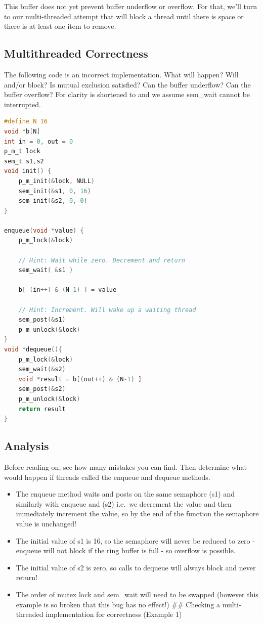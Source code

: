 This buffer does not yet prevent buffer underflow or overflow. For that, we'll turn to our multi-threaded attempt that will block a thread until there is space or there is at least one item to remove.


\subsection{Multithreaded Correctness}\label{checking-a-multi-threaded-implementation-for-correctness-example-1}

The following code is an incorrect implementation. What will happen? Will  and/or  block? Is mutual exclusion satisfied? Can the buffer underflow? Can the buffer overflow? For clarity  is shortened to  and we assume sem\_wait cannot be interrupted.

\begin{lstlisting}[language=C]
#define N 16
void *b[N]
int in = 0, out = 0
p_m_t lock
sem_t s1,s2
void init() { 
    p_m_init(&lock, NULL)
    sem_init(&s1, 0, 16)
    sem_init(&s2, 0, 0)
}

enqueue(void *value) {
    p_m_lock(&lock)

    // Hint: Wait while zero. Decrement and return
    sem_wait( &s1 ) 
 
    b[ (in++) & (N-1) ] = value

    // Hint: Increment. Will wake up a waiting thread 
    sem_post(&s1) 
    p_m_unlock(&lock)
}
void *dequeue(){
    p_m_lock(&lock)
    sem_wait(&s2)
    void *result = b[(out++) & (N-1) ]
    sem_post(&s2)
    p_m_unlock(&lock)
    return result
}
\end{lstlisting}

\subsection{Analysis}\label{analysis}

Before reading on, see how many mistakes you can find. Then determine what would happen if threads called the enqueue and dequeue methods.

\begin{itemize}
\tightlist
\item
  The enqueue method waits and posts on the same semaphore (s1) and similarly with enqueue and (s2) i.e.~we decrement the value and then immediately increment the value, so by the end of the function the semaphore value is unchanged!
\item
  The initial value of s1 is 16, so the semaphore will never be reduced to zero - enqueue will not block if the ring buffer is full - so overflow is possible.
\item
  The initial value of s2 is zero, so calls to dequeue will always block and never return!
\item
  The order of mutex lock and sem\_wait will need to be swapped (however this example is so broken that this bug has no effect!) \#\# Checking a multi-threaded implementation for correctness (Example 1)
\end{itemize}

